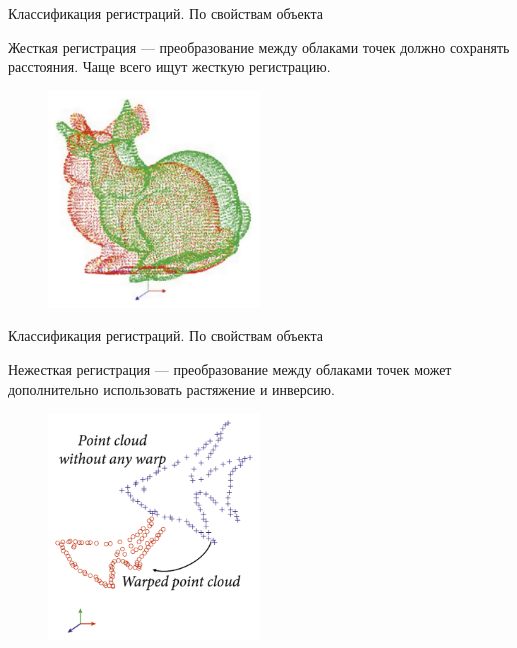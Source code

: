 \documentclass[6pt,pdf,utf8,russian]{beamer}
\begin{document}
\begin{frame}[fragile]{Классификация регистраций. По свойствам объекта}
    \begin{block}{}
        Жесткая регистрация --- преобразование между облаками точек должно сохранять расстояния.
        Чаще всего ищут жесткую регистрацию.
    \end{block}

    \pause

    \begin{figure}
        \includegraphics[width=0.5\textwidth]{images/rigid_registration.jpg}
    \end{figure}
\end{frame}

\begin{frame}[fragile]{Классификация регистраций. По свойствам объекта}
    \begin{block}{}
        Нежесткая регистрация --- преобразование между облаками точек может дополнительно
        использовать растяжение и инверсию.
    \end{block}

    \pause
    \begin{figure}
        \includegraphics[width=0.5\textwidth]{images/nonrigid_registration.jpg}
    \end{figure}

\end{frame}
\end{document}
